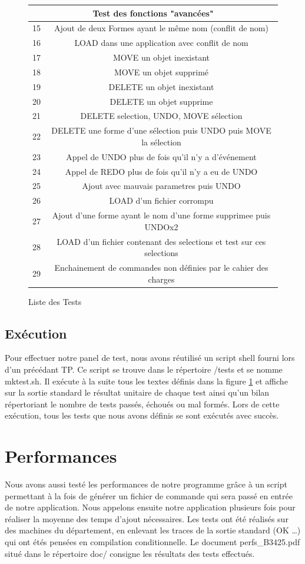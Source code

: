 \documentclass[12pt]{article}
\begin{document}
\begin{figure}[!h]
\begin{center}
\begin{tabular}{|c|c|}
\multicolumn{2}{|c|}{\textbf{\large{Test des fonctions "avancées"}}}\\
\hline
15 & Ajout de deux Formes ayant le même nom (conflit de nom)\\
\hline
16 & LOAD dans une application avec conflit de nom\\
\hline
17 & MOVE un objet inexistant\\
\hline
18 & MOVE un objet supprimé\\
\hline
19 & DELETE un objet inexistant\\
\hline
20 & DELETE un objet supprime\\
\hline
21 & DELETE selection, UNDO, MOVE sélection\\
\hline
22 & DELETE une forme d'une sélection puis UNDO puis MOVE la sélection\\
\hline
23 & Appel de UNDO plus de fois qu'il n'y a d'événement\\
\hline
24 & Appel de REDO plus de fois qu'il n'y a eu de UNDO\\
\hline
25 & Ajout avec mauvais parametres puis UNDO\\
\hline
26 & LOAD d'un fichier corrompu\\
\hline
27 & Ajout d'une forme ayant le nom d'une forme supprimee puis UNDOx2\\
\hline
28 & LOAD d'un fichier contenant des selections et test sur ces selections\\
\hline
29 & Enchainement de commandes non définies par le cahier des charges\\
\hline
\end{tabular}
\end{center}
\caption{Liste des Tests}
\label{tab:Liste des Tests}
\end{figure}
\subsection{Exécution}
Pour effectuer notre panel de test, nous avons réutilisé un script shell fourni lors d'un précédant TP. Ce script se trouve dans le répertoire /tests et se nomme mktest.sh. Il exécute à la suite tous les textes définis dans la figure \ref{tab:Liste des Tests} et affiche sur la sortie standard le résultat unitaire de chaque test ainsi qu'un bilan répertoriant le nombre de tests passés, échoués ou mal formés. Lors de cette exécution, tous les tests que nous avons définis se sont exécutés avec succès. 

\section{Performances}
Nous avons aussi testé les performances de notre programme grâce à un script permettant à la fois de générer un fichier de commande qui sera passé en entrée de notre application. Nous appelons ensuite notre application plusieurs fois pour réaliser la moyenne des temps d'ajout nécessaires. Les tests ont été réalisés sur des machines du département, en enlevant les traces de la sortie standard (OK \ldots) qui ont étés pensées en compilation conditionnelle. Le document perfs\_B3425.pdf situé dans le répertoire doc/ consigne les résultats des tests effectués.
\end{document}

